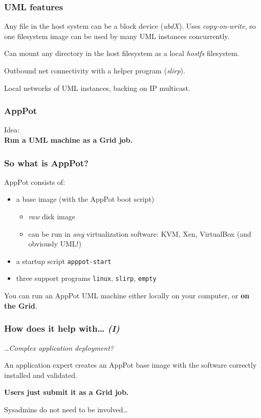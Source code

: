 \documentclass{beamer}
\begin{document}
\begin{frame}
  \frametitle{UML features}
  \label{sec:7}
  Any file in the host system can be a block device (\emph{ubdX}).
  Uses \emph{copy-on-write}, so one filesystem image can be used by many
  UML instances concurrently.

  \+
  Can mount any directory in the host filesystem as a local
  \emph{hostfs} filesystem.
  
  \+
  Outbound net connectivity with a helper program (\emph{slirp}).
  
  \+
  Local networks of UML instances, backing on IP multicast.
\end{frame}


\begin{frame}
  \frametitle{AppPot}
  \label{sec:8}
  \begin{center}
    \Large
    Idea: 
    \\
    \textbf{Run a UML machine as a Grid job.}
  \end{center}
\end{frame}


\begin{frame}
  \frametitle{So what is AppPot?}
  \label{sec:9}
  AppPot consists of:
  \begin{itemize}
  \item a base image (with the AppPot boot script)
    \begin{itemize}
    \item \emph{raw} disk image
    \item can be run in \emph{any} virtualization software: KVM, Xen,
      VirtualBox (and obviously UML!)
    \end{itemize}
  \item a startup script \texttt{apppot-start}
  \item three support programs \texttt{linux}, \texttt{slirp}, \texttt{empty}
  \end{itemize}

  \+
  You can run an AppPot UML machine either locally on your computer,
  or \textbf{on the Grid}.
\end{frame}


\begin{frame}
  \frametitle{How does it help with\ldots{} \emph{(I)}}
  \label{sec:10}
  
  \emph{\ldots Complex application deployment?}

  \+
  An application expert creates an AppPot base image with the
  software correctly installed and validated.
  
  \+
  \textbf{Users just submit it as a Grid job.}

  \+
  Sysadmins do not need to be involved\ldots
\end{frame}
\end{document}
